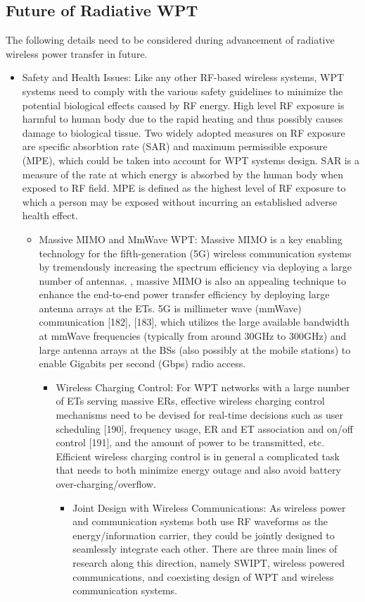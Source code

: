\documentclass[hidelinks, 12pt]{report}
\begin{document}
\begin{itemize}
\begin{itemize}
\begin{itemize}
\begin{itemize}
\begin{itemize}
\chapter{Future of Radiative WPT}
\justify
The following details need to be considered during advancement of radiative wireless power transfer in future.

\begin{itemize}
\item{Safety and Health Issues: Like any other RF-based wireless systems, WPT systems need to comply with the various safety guidelines to minimize the potential biological effects caused by RF energy. High level RF exposure is harmful to human body due to the rapid heating and thus possibly causes damage to biological tissue. Two widely adopted measures on RF exposure are specific absorbtion rate (SAR) and maximum permissible exposure (MPE), which could be taken into account for WPT systems design. SAR is a measure of the rate at which energy is absorbed by the human body when exposed to RF field.  MPE is defined as the highest level of RF exposure to which a person may be exposed without incurring an established adverse health effect.}
\begin{itemize}
\item{Massive MIMO and MmWave WPT: Massive MIMO is a key enabling technology for the fifth-generation (5G) wireless communication systems by tremendously increasing the spectrum efficiency via deploying a large number of antennas. , massive MIMO is also an appealing technique to enhance the end-to-end power transfer efficiency by deploying large antenna arrays at the ETs. 5G is millimeter wave (mmWave) communication [182], [183], which utilizes the large available bandwidth at mmWave frequencies (typically from around 30GHz to 300GHz) and large antenna arrays at the BSs (also possibly at the mobile stations) to enable Gigabits per second (Gbps) radio access. }
\begin{itemize}
\item{Wireless Charging Control: For WPT networks with a large number of ETs serving massive ERs, effective wireless charging control mechanisms need to be devised for real-time decisions such as user scheduling [190], frequency usage, ER and ET association and on/off control [191], and the amount of power to be transmitted, etc. Efficient wireless charging control is in general a complicated task that needs to both minimize energy outage and also avoid battery over-charging/overflow.}
\begin{itemize}
\item{Joint Design with Wireless Communications: As wireless power and communication systems both use RF waveforms as the energy/information carrier, they could be jointly designed to seamlessly integrate each other. There are three main lines of research along this direction, namely SWIPT, wireless powered communications, and coexisting design of WPT and wireless communication systems.}





\end{itemize}
\end{itemize}
\end{itemize}
\end{itemize}
\end{itemize}
\end{itemize}
\end{itemize}
\end{itemize}
\end{itemize}
\end{document}
